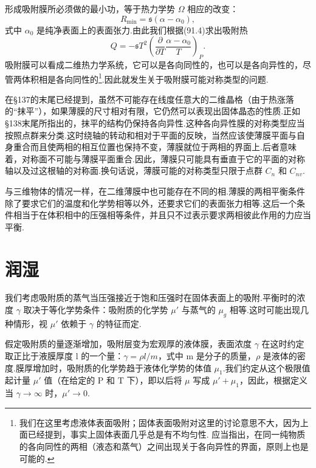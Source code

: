 形成吸附膜所必须做的最小功，等于热力学势 $\Omega$ 相应的改变：
\begin{equation}
  R_{\mathrm{min}}=\mathfrak{s}(\alpha-\alpha_0),
\end{equation}
式中 $\alpha_0$ 是纯净表面上的表面张力.由此我们根据(91.4)求出吸附热
\begin{equation}
  Q=-\mathfrak{s}T^2\left(\frac{\partial}{\partial T}
  \frac{\alpha-\alpha_0}{T}\right)_P.
\end{equation}
吸附膜可以看成二维热力学系统，它可以是各向同性的，也可以是各向异性的，尽管两体积相是各向同性的\footnote{我们在这里考虑液体表面吸附；固体表面吸附对这里的讨论意思不大，因为上面已经提到，事实上固体表面几乎总是有不均匀性. 应当指出，在同一纯物质的各向同性的两相（液态和蒸气）之间出现关于各向异性的界面，原则上也是可能的.}.因此就发生关于吸附膜可能对称类型的问题.

在§137的末尾已经提到，虽然不可能存在线度任意大的二维晶格（由于热涨落的“抹平”），如果薄膜的尺寸相对有限，它仍然可以表现出固体晶态的性质.正如§138末尾所指出的，抹平的结构仍保持各向异性.这种各向异性膜的对称类型应当按照点群来分类.这时绕轴的转动和相对于平面的反映，当然应该使薄膜平面与自身重合而且使两相的相互位置也保持不变，薄膜就位于两相的界面上.后者意味着，对称面不可能与薄膜平面重合.因此，薄膜只可能具有垂直于它的平面的对称轴以及过这根轴的对称面.换句话说，薄膜可能的对称类型只限于点群 $C_n$ 和 $C_{nv}$.

与三维物体的情况一样，在二维薄膜中也可能存在不同的相.薄膜的两相平衡条件除了要求它们的温度和化学势相等以外，还要求它们的表面张力相等.这后一个条件相当于在体积相中的压强相等条件，并且只不过表示要求两相彼此作用的力应当平衡.

\section{润湿}

我们考虑吸附质的蒸气当压强接近于饱和压强时在固体表面上的吸附.平衡时的浓度 $\gamma$ 取决于等化学势条件：吸附质的化学势 $\mu'$ 与蒸气的 $\mu_g$ 相等.这时可能出现几种情形，视 $\mu'$ 依赖于 $\gamma$ 的特征而定.

假定吸附质的量逐渐增加，吸附层变为宏观厚的液体膜，表面浓度 $\gamma$ 在这时约定取正比于液膜厚度 l 的一个量：$\gamma=\rho l/m$，式中 m 是分子的质量，$\rho$ 是液体的密度.膜厚增加时，吸附质的化学势趋于液体化学势的体值 $\mu_1$.我们约定从这个极限值起计量 $\mu'$ 值（在给定的 P 和 T 下），即以后将 $\mu$ 写成 $\mu'+\mu_1$，因此，根据定义当 $\gamma\to\infty$ 时，$\mu'\to0$.

